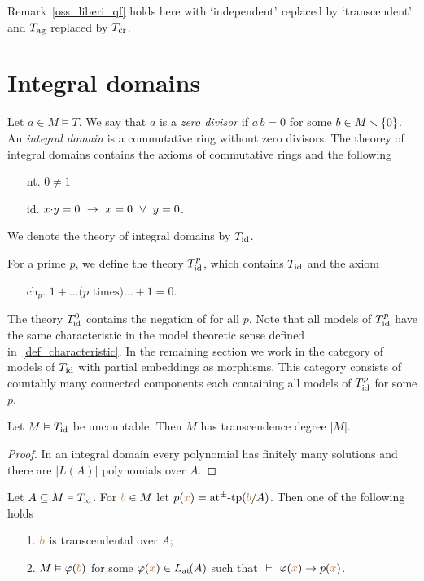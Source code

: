 \documentclass[creche.tex]{subfiles}
\begin{document}
\begin{remark}\label{oss_liberi_cr}
Remark~\ref{oss_liberi_qf} holds here with `independent' replaced by `transcendent' and $T_{\rm ag}$ replaced by $T_{\rm cr}$.\QED
\end{remark}

\section{Integral domains}

Let $a\in M\models T$. We say that $a$ is a \emph{zero divisor} if $a\,b=0$ for some $b\in M\sm\{0\}$. An \emph{integral domain\/} is a commutative ring without zero divisors. The theorey of integral domains contains the axioms of commutative rings and the following
\begin{itemize}
\item[nt.] $0\neq 1$
\item[id.] $x\mdot y =0\ \imp\ x=0\ \vee\ y=0$.
\end{itemize}

We denote the theory  of integral domains by \emph{$T_{\rm id}$}.

For a prime $p$, we define the theory \emph{$T^p_{\rm id}$}, which contains $T_{\rm id}$ and the axiom
\begin{itemize}
\item[ch$_p$.]$1+\dots \mbox{($p$ times)}\dots +1=0$.
\end{itemize}
The theory \emph{$T^0_{\rm id}$\/} contains the negation of  for all $p$. Note that all models of $T^p_{\rm id}$ have the same characteristic in the model theoretic sense defined in~\ref{def_characteristic}. In the remaining section we work in the category of models of $T_{\rm id}$ with partial embeddings as morphisms. This category consists of countably many connected components each containing all models of $T^p_{\rm id}$ for some $p$.


\begin{proposition}\label{prop_uncontable_trascendente}
Let $M\models T_{\rm id}$ be uncountable. Then $M$ has transcendence degree $|M|$.
\end{proposition}

\begin{proof}
In an integral domain every polynomial has finitely many solutions and there are $|L(A)|$ polynomials over $A$.
\end{proof}



\begin{proposition}\label{prop_di_tipi princ_comp}
Let $A\subseteq M\models T_{\rm id}$. For ${\mr b}\in M$ let $p({\mr x})=\atpmtp({\mr b}/A)$. Then one of the following holds  
\begin{itemize}
\item[1.] ${\mr b}$ is transcendental over $A$;
\item[2.] $M\models\phi({\mr b})$ for some $\phi({\mr x})\in\atL(A)$ such that
$\ \proves\ \phi({\mr x})\imp p({\mr x})$.
\end{itemize}\end{proposition}
\end{document}
